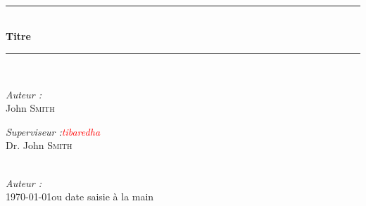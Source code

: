 \begin{titlepage} 
	\newcommand{\HRule}{\rule{\linewidth}{0.5mm}} %
	\begin{center}                                %
		\textsc{\LARGE{}\radp}              \\[0.5cm]
		\textsc{\Large{}\dsp}               \\[0.5cm]  %
		\textsc{\large{}\isp}               \\[0.5cm]  %
		\HRule \\[0.6cm] {\huge\bfseries{}Titre} \\[0.25cm] \HRule \\[1.5cm] %
		
		\begin{minipage}{0.45\linewidth} 
			\begin{flushleft}  %
				\Large\textit{Auteur :} \\ John \textsc{Smith} %
			\end{flushleft} 
		\end{minipage} 
		\hfill 
		\begin{minipage}{0.45\linewidth} 
			\begin{flushright} %
				\Large\textit{Superviseur :\textcolor{red}{tibaredha}} \\ Dr. John \textsc{Smith} %
			\end{flushright} 
		\end{minipage} \\[2cm] %
		\Large\textit{Auteur :} \\ %
		\today ou date saisie à la main %
	\end{center} 
	\vfill %
\end{titlepage}
\clearpage\setcounter{page}{2}